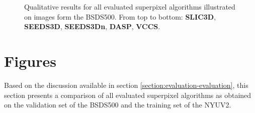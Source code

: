 \begin{figure}
{	}
	\caption[Qualitative results for \textbf{SLIC3D}, \textbf{SEEDS3D}, \textbf{DASP} \cite{WeikersdorferGossowBeetz:2012} and \textbf{VCCS} \cite{PaponAbramovSchoelerWoergoetter:2013} illustrated on images from the NYU Depth Dataset \cite{SilbermanHoiemKohliFergus:2012}.]{Qualitative results for all evaluated superpixel algorithms illustrated on images form the BSDS500. From top to bottom: \textbf{SLIC3D}, \textbf{SEEDS3D}, \textbf{SEEDS3Dn}, \textbf{DASP}, \textbf{VCCS}.}
\end{figure}

\newpage
\section{Figures}

Based on the discussion available in section \ref{section:evaluation-evaluation}, this section presents a comparison of all evaluated superpixel algorithms as obtained on the validation set of the BSDS500 and the training set of the NYUV2.
